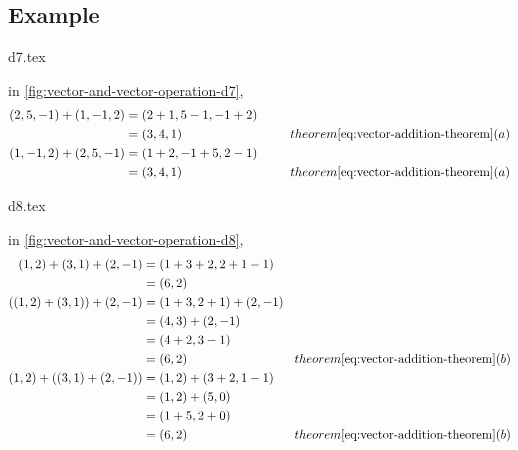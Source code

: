 \subsection{Example}
\begin{center}
    {d7.tex}
\end{center}
in \ref{fig:vector-and-vector-operation-d7},
\[
    \begin{split}
        (2,5,-1)+(1,-1,2) & = (2+1,5-1,-1+2) \\
        & = (3,4,1) \hspace{3cm}{theorem }\ref{eq:vector-addition-theorem}(a) \\
        (1,-1,2)+(2,5,-1) & = (1+2,-1+5,2-1) \\
        & = (3,4,1) \hspace{3cm}{theorem }\ref{eq:vector-addition-theorem}(a) \\
    \end{split}
\]
\begin{center}
    {d8.tex}
\end{center}
in \ref{fig:vector-and-vector-operation-d8},
\[
    \begin{split}
        (1,2)+(3,1)+(2,-1) & = (1+3+2,2+1-1) \\
                          & = (6,2) \\
        ((1,2)+(3,1))+(2,-1) & = (1+3,2+1)+(2,-1) \\
                          & = (4,3)+(2,-1) \\
                          & = (4+2,3-1) \\
                          & = (6,2) \hspace{3cm}{theorem }\ref{eq:vector-addition-theorem}(b) \\
                          (1,2)+((3,1)+(2,-1)) & = (1,2)+(3+2,1-1) \\
                          & = (1,2)+(5,0) \\
                          & = (1+5,2+0) \\
                          & = (6,2) \hspace{3cm}{theorem }\ref{eq:vector-addition-theorem}(b) \\
    \end{split}
\]